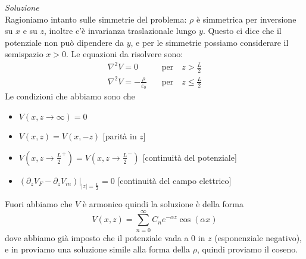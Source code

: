 \textit{Soluzione}\\
Ragioniamo intanto sulle simmetrie del problema: $ \rho $ è simmetrica per inversione su $ x $ e su $ z $, inoltre c'è invarianza traslazionale 
lungo $ y $. Questo ci dice che il potenziale non può dipendere da $ y $, e per le simmetrie possiamo considerare il semispazio $ x > 0 $. 
Le equazioni da risolvere sono:
\begin{align}
  \nabla^2 V = 0 \quad &\text{per} \quad z > \frac{L}{2} \\
  \nabla^2 V = -\frac{\rho}{\varepsilon_0} \quad &\text{per} \quad z \leq \frac{L}{2} 
\end{align}
Le condizioni che abbiamo sono che
\begin{itemize}
  \item $ V(x, z \to \infty) = 0 $
  \item $ V(x,z) = V(x,-z) $ \hfill [parità in $ z $] 
  \item $ V(x, z \to \frac{L}{2}^{+}) = V(x, z \to \frac{L}{2}^{-}) $ \hfill [continuità del potenziale]
  \item $ (\partial_z V_F - \partial_z V_{in})|_{|z| = \frac{L}{2}} = 0 $ \hfill [continuità del campo elettrico]
\end{itemize}
Fuori abbiamo che $ V $ è armonico quindi la soluzione è della forma
\begin{equation}
  V(x,z) = \sum_{n = 0}^{\infty} C_n e^{-\alpha z} \cos(\alpha x)
\end{equation}
dove abbiamo già imposto che il potenziale vada a $ 0 $ in $ z $ (esponenziale negativo), e in proviamo una soluzione simile alla forma della $ \rho $, 
quindi proviamo il coseno.

